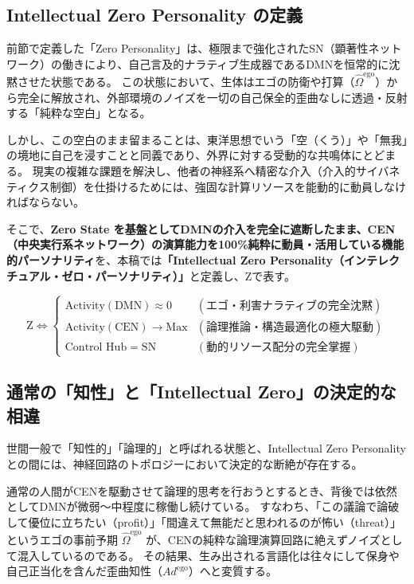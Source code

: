 \subsection{Intellectual Zero Personality の定義}
前節で定義した「Zero Personality」は、極限まで強化されたSN（顕著性ネットワーク）の働きにより、自己言及的ナラティブ生成器であるDMNを恒常的に沈黙させた状態である。
この状態において、生体はエゴの防衛や打算（$\hat{\Omega}^{\mathrm{ego}}$）から完全に解放され、外部環境のノイズを一切の自己保全的歪曲なしに透過・反射する「純粋な空白」となる。

しかし、この空白のまま留まることは、東洋思想でいう「空（くう）」や「無我」の境地に自己を浸すことと同義であり、外界に対する受動的な共鳴体にとどまる。
現実の複雑な課題を解決し、他者の神経系へ精密な介入（介入的サイバネティクス制御）を仕掛けるためには、強固な計算リソースを能動的に動員しなければならない。

そこで、\textbf{Zero State を基盤としてDMNの介入を完全に遮断したまま、CEN（中央実行系ネットワーク）の演算能力を100\%純粋に動員・活用している機能的パーソナリティ}を、本稿では\textbf{「Intellectual Zero Personality（インテレクチュアル・ゼロ・パーソナリティ）」}と定義し、$\mathrm{Z}$で表す。

\begin{equation}
    \mathrm{Z} \iff 
    \begin{cases}
        \text{Activity}(\mathrm{DMN}) \approx 0 & (\text{エゴ・利害ナラティブの完全沈黙}) \\
        \text{Activity}(\mathrm{CEN}) \to \mathrm{Max} & (\text{論理推論・構造最適化の極大駆動}) \\
        \text{Control Hub} = \mathrm{SN} & (\text{動的リソース配分の完全掌握})
    \end{cases}
\end{equation}

\subsection{通常の「知性」と「Intellectual Zero」の決定的な相違}
世間一般で「知性的」「論理的」と呼ばれる状態と、Intellectual Zero Personality との間には、神経回路のトポロジーにおいて決定的な断絶が存在する。

通常の人間がCENを駆動させて論理的思考を行おうとするとき、背後では依然としてDMNが微弱〜中程度に稼働し続けている。
すなわち、「この議論で論破して優位に立ちたい（profit）」「間違えて無能だと思われるのが怖い（threat）」というエゴの事前予期 $\hat{\Omega}^{\mathrm{ego}}$ が、CENの純粋な論理演算回路に絶えずノイズとして混入しているのである。
その結果、生み出される言語化は往々にして保身や自己正当化を含んだ歪曲知性（$Ad^{\mathrm{ego}}$）へと変質する。

